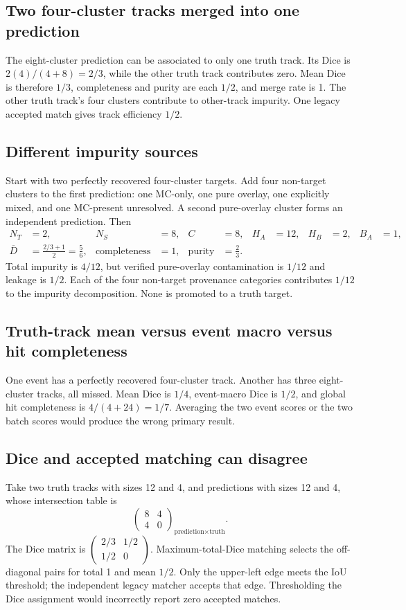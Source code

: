 \documentclass[11pt,letterpaper]{article}
\begin{document}
\subsection{Two four-cluster tracks merged into one prediction}
The eight-cluster prediction can be associated to only one truth track. Its
Dice is $2(4)/(4+8)=2/3$, while the other truth track contributes zero. Mean Dice
is therefore $1/3$, completeness and purity are each $1/2$, and merge rate is 1.
The other truth track's four clusters contribute to other-track impurity.
One legacy accepted match gives track efficiency $1/2$.

\subsection{Different impurity sources}
Start with two perfectly recovered four-cluster targets. Add four non-target
clusters to the first prediction: one MC-only, one pure overlay, one explicitly
mixed, and one MC-present unresolved. A second pure-overlay cluster forms an
independent prediction. Then
\begin{align}
 N_T&=2,&N_S&=8,&C&=8,&H_A&=12,&H_B&=2,&B_A&=1,\\
 \overline D&=\frac{2/3+1}{2}=\frac56,&
 \text{completeness}&=1,&\text{purity}&=\frac23.
\end{align}
Total impurity is $4/12$, but verified pure-overlay contamination is $1/12$ and
leakage is $1/2$. Each of the four non-target provenance categories contributes
$1/12$ to the impurity decomposition. None is promoted to a truth target.

\subsection{Truth-track mean versus event macro versus hit completeness}
One event has a perfectly recovered four-cluster track. Another has three
eight-cluster tracks, all missed. Mean Dice is $1/4$, event-macro Dice is $1/2$,
and global hit completeness is $4/(4+24)=1/7$. Averaging the two event scores or
the two batch scores would produce the wrong primary result.

\subsection{Dice and accepted matching can disagree}
Take two truth tracks with sizes 12 and 4, and predictions with sizes 12 and 4,
whose intersection table is
\begin{equation}
 \begin{pmatrix}8&4\\4&0\end{pmatrix}_{\text{prediction}\times\text{truth}}.
\end{equation}
The Dice matrix is
$\left(\begin{smallmatrix}2/3&1/2\\1/2&0\end{smallmatrix}\right)$.
Maximum-total-Dice matching selects the off-diagonal pairs for total 1 and mean
$1/2$. Only the upper-left edge meets the IoU threshold; the independent legacy
matcher accepts that edge. Thresholding the Dice assignment would incorrectly
report zero accepted matches.
\end{document}
